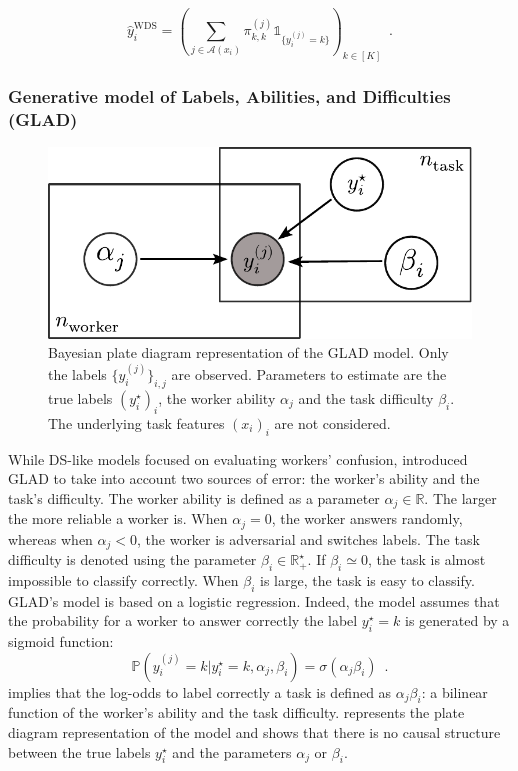 \begin{equation}
    \hat y_i^{\mathrm{WDS}} = \left(\sum_{j\in\mathcal{A}(x_i)} \pi^{(j)}_{k,k}\mathds{1}_{\{y_i^{(j)}=k\}}\right)_{k\in[K]} \enspace.
\end{equation}

\subsubsection{Generative model of Labels, Abilities, and Difficulties (GLAD)}
\label{subsub:glad}

\begin{figure}[thb]
    \centering
    \includegraphics[width=.6\linewidth]{chapters/images/glad_plaque.pdf}
    \caption{Bayesian plate diagram representation of the GLAD model. Only the labels $\{y_i^{(j)}\}_{i,j}$ are observed. Parameters to estimate are the true labels $(y_i^\star)_i$, the worker ability $\alpha_j$ and the task difficulty $\beta_i$. The underlying task features $(x_i)_i$ are not considered.}
    \label{fig:plaque_glad}
\end{figure}

While DS-like models focused on evaluating workers' confusion, \citet{whitehill_whose_2009} introduced GLAD to take into account two sources of error: the worker's ability and the task's difficulty.
The worker ability is defined as a parameter $\alpha_j\in\mathbb{R}$. The larger the more reliable a worker is.
When $\alpha_j = 0$, the worker answers randomly, whereas when $\alpha_j<0$, the worker is adversarial and switches labels.
The task difficulty is denoted using the parameter $\beta_i\in\mathbb{R}^\star_+$.
If $\beta_i\simeq 0$, the task is almost impossible to classify correctly. When $\beta_i$ is large, the task is easy to classify.
GLAD's model is based on a logistic regression.
Indeed, the model assumes that the probability for a worker to answer correctly the label $y_i^\star=k$ is generated by a sigmoid function:
\begin{equation}\label{eq:glad}
    \mathbb{P}(y_i^{(j)}=k |y_i^\star=k, \alpha_j,\beta_i) = \sigma(\alpha_j\beta_i) \enspace.
\end{equation}
 implies that the log-odds to label correctly a task is defined as $\alpha_j\beta_i$: a bilinear function of the worker's ability and the task difficulty.  represents the plate diagram representation of the model and shows that there is no causal structure between the true labels $y_i^\star$ and the parameters $\alpha_j$ or $\beta_i$.

